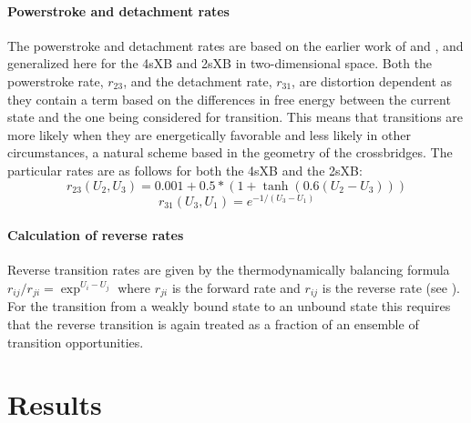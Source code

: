 \documentclass[]{article}
\begin{document}
\paragraph{Powerstroke and detachment rates} %
The powerstroke and detachment rates are based on the earlier work of \citet{Pate1989} and \citet{Tanner:2007:pe115}, and generalized here for the 4sXB and 2sXB in two-dimensional space. 
Both the powerstroke rate, $r_{23}$, and the detachment rate, $r_{31}$, are distortion dependent as they contain a term based on the differences in free energy between the current state and the one being considered for transition. 
This means that transitions are more likely when they are energetically favorable and less likely in other circumstances, a natural scheme based in the geometry of the crossbridges.
The particular rates are as follows for both the 4sXB and the 2sXB:
$$r_{23}(U_2, U_3) = 0.001 + 0.5 * (1 + \tanh(0.6 (U_2 - U_3))) $$
$$r_{31}(U_3, U_1) = e^{-1 / (U_3 - U_1)}$$

\paragraph{Calculation of reverse rates} %
Reverse transition rates are given by the thermodynamically balancing formula $r_{ij}/r_{ji}=\exp^{U_i-U_j}$ where $r_{ji}$ is the forward rate and $r_{ij}$ is the reverse rate (see \citet{Pate1989, Daniel1998, Tanner:2007:pe115}).
For the transition from a weakly bound state to an unbound state this requires that the reverse transition is again treated as a fraction of an ensemble of transition opportunities.



\section{Results} %

\end{document}
